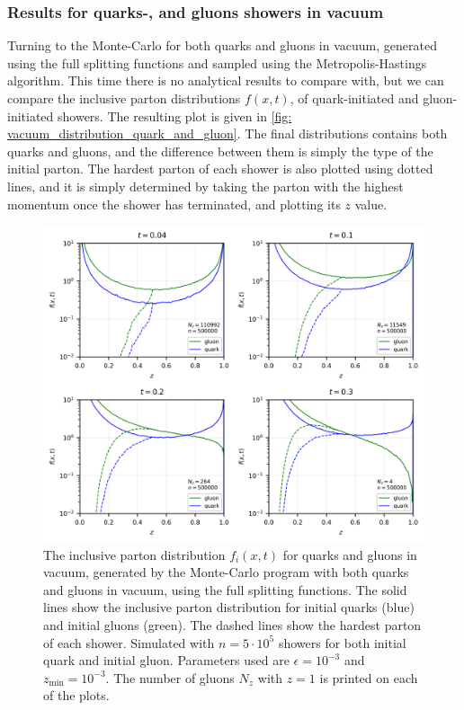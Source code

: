 \documentclass[main.tex]{subfiles}
\begin{document}
\subsubsection*{Results for quarks-, and gluons showers in vacuum}
Turning to the Monte-Carlo for both quarks and gluons in vacuum, generated using the full splitting functions and sampled using the Metropolis-Hastings algorithm. This time there is no analytical results to compare with, but we can compare the inclusive parton distributions \(f(x,t)\), of quark-initiated and gluon-initiated showers. The resulting plot is given in \autoref{fig: vacuum_distribution_quark_and_gluon}. The final distributions contains both quarks and gluons, and the difference between them is simply the type of the initial parton. The hardest parton of each shower is also plotted using dotted lines, and it is simply determined by taking the parton with the highest momentum once the shower has terminated, and plotting its \(z\) value.
\begin{figure}[htb]
    \centering
    \includegraphics[width=13cm]{pictures/plots/distributions/vacuum/dasgupta_quarksgluons_N500000.png}
    \caption{The inclusive parton distribution \(f_i(x,t)\) for quarks and gluons in vacuum, generated by the Monte-Carlo program with both quarks and gluons in vacuum, using the full splitting functions. The solid lines show the inclusive parton distribution for initial quarks (blue) and initial gluons (green). The dashed lines show the hardest parton of each shower. Simulated with \(n=5\cdot10^5\) showers for both initial quark and initial gluon. Parameters used are \(\epsilon=10^{-3}\) and \(z_{\text{min}}=10^{-3}\). The number of gluons \(N_z\) with \(z=1\) is printed on each of the plots.}
    \label{fig: vacuum_distribution_quark_and_gluon}
\end{figure}
\end{document}
